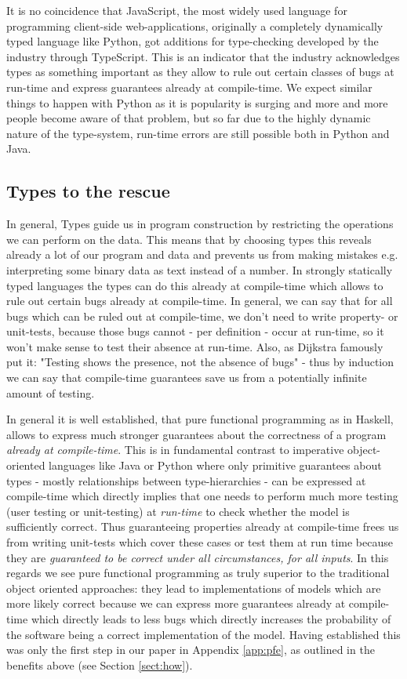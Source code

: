 It is no coincidence that JavaScript, the most widely used language for programming client-side web-applications, originally a completely dynamically typed language like Python, got additions for type-checking developed by the industry through TypeScript. This is an indicator that the industry acknowledges types as something important as they allow to rule out certain classes of bugs at run-time and express guarantees already at compile-time. We expect similar things to happen with Python as it is popularity is surging and more and more people become aware of that problem, but so far due to the highly dynamic nature of the type-system, run-time errors are still possible both in Python and Java. 

\subsection{Types to the rescue}
In general, Types guide us in program construction by restricting the operations we can perform on the data. This means that by choosing types this reveals already a lot of our program and data and prevents us from making mistakes e.g. interpreting some binary data as text instead of a number. In strongly statically typed languages the types can do this already at compile-time which allows to rule out certain bugs already at compile-time. In general, we can say that for all bugs which can be ruled out at compile-time, we don't need to write property- or unit-tests, because those bugs cannot - per definition - occur at run-time, so it won't make sense to test their absence at run-time. Also, as Dijkstra famously put it: "Testing shows the presence, not the absence of bugs" - thus by induction we can say that compile-time guarantees save us from a potentially infinite amount of testing.

In general it is well established, that pure functional programming as in Haskell, allows to express much stronger guarantees about the correctness of a program \textit{already at compile-time}. This is in fundamental contrast to imperative object-oriented languages like Java or Python where only primitive guarantees about types - mostly relationships between type-hierarchies - can be expressed at compile-time which directly implies that one needs to perform much more testing (user testing or unit-testing) at \textit{run-time} to check whether the model is sufficiently correct. Thus guaranteeing properties already at compile-time frees us from writing unit-tests which cover these cases or test them at run time because they are \textit{guaranteed to be correct under all circumstances, for all inputs}. In this regards we see pure functional programming as truly superior to the traditional object oriented approaches: they lead to implementations of models which are more likely correct because we can express more guarantees already at compile-time which directly leads to less bugs which directly increases the probability of the software being a correct implementation of the model. Having established this was only the first step in our paper in Appendix \ref{app:pfe}, as outlined in the benefits above (see Section \ref{sect:how}). 

